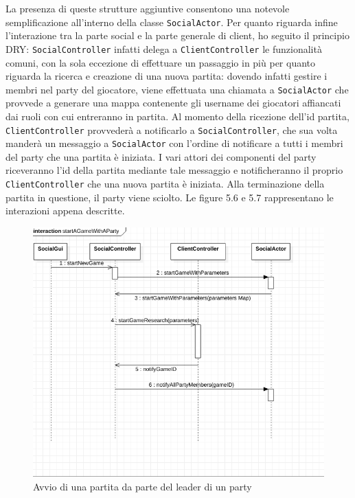 La presenza di queste strutture aggiuntive consentono una notevole semplificazione all'interno della classe \texttt{SocialActor}.
Per quanto riguarda infine l'interazione tra la parte social e la parte generale di client, ho seguito il principio DRY: \texttt{SocialController} infatti delega a \texttt{ClientController} le funzionalità comuni, con la sola eccezione di effettuare un passaggio in più per quanto riguarda la ricerca e creazione di una nuova partita: dovendo infatti gestire i membri nel party del giocatore, viene effettuata una chiamata a \texttt{SocialActor} che provvede a generare una mappa contenente gli username dei giocatori affiancati dai ruoli con cui entreranno in partita.
Al momento della ricezione dell'id partita, \texttt{ClientController} provvederà a notificarlo a \texttt{SocialController}, che  sua volta manderà un messaggio a \texttt{SocialActor} con l'ordine di notificare a tutti i membri del party che una partita è iniziata. I vari attori dei componenti del party riceveranno l'id della partita mediante tale messaggio e notificheranno il proprio \texttt{ClientController} che una nuova partita è iniziata.
Alla terminazione della partita in questione, il party viene sciolto.
Le figure 5.6 e 5.7 rappresentano le interazioni appena descritte.  

\begin{figure}[H]
	\includegraphics[width=\textwidth,height=\textheight,keepaspectratio]{socialStartGame}
	\caption{Avvio di una partita da parte del leader di un party}
\end{figure}

